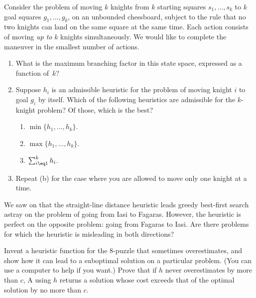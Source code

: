\begin{iexercise}%
Consider the problem of moving \(k\) knights from \(k\) starting squares
\(s_1,\ldots,s_k\) to \(k\) goal squares \(g_1,\ldots,g_k\), on an 
unbounded chessboard, subject
to the rule that no two knights can land on the same square at the same time. 
Each action consists of moving {\em up to} \(k\) knights simultaneously.
We would like to complete the maneuver in the smallest number of actions.
\begin{enumerate}
\item What is the maximum branching factor in this state space, expressed as a function of~\(k\)?
\item Suppose \(h_i\) is an admissible heuristic for the problem of moving
knight \(i\) to goal \(g_i\) by itself. Which of the following heuristics
are admissible for the \(k\)-knight problem? Of those, which is the best?
\begin{enumerate}
\item \(\min\{h_1,\ldots,h_k\}\).
\item \(\max\{h_1,\ldots,h_k\}\).
\item \(\sum_{i\eq 1}^{k} h_i\).
\end{enumerate}
\item Repeat (b) for the case where you are allowed to move only one knight at a time.
\end{enumerate}
\end{iexercise} 

\begin{iexercise}
We saw on  that the straight-line distance
heuristic leads greedy best-first search astray on the problem of going from Iasi to Fagaras.
However, the heuristic is perfect on the opposite problem:  going
from Fagaras to Iasi.  Are there problems for which the heuristic is
misleading in both directions?
\end{iexercise} 

\begin{uexercise}
Invent a heuristic function for the 8-puzzle that sometimes overestimates,
and show how it can lead to a suboptimal solution on a particular
problem. (You can use a computer to help if you want.) Prove that if
\(h\) never overestimates by more than \(c\), A{\star} using \(h\) returns a
solution whose cost exceeds that of the optimal solution by no more
than \(c\).
\end{uexercise} 

